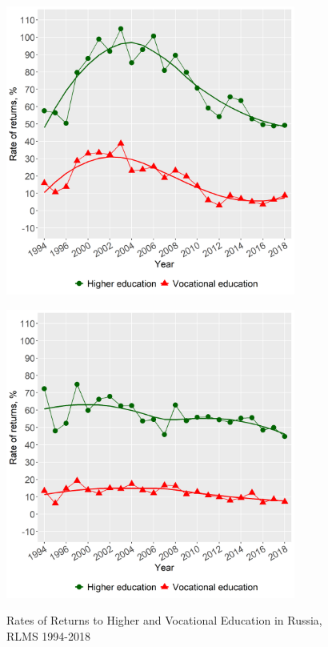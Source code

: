 \documentclass[12pt,a4paper]{article}
\begin{document}
\begin{figure}[H]
  \begin{minipage}[b]{.5\linewidth}
     \centering
     \hspace*{-0.7in}
     \includegraphics[width=270pt]{p2a.png}
     \label{fig:2a}
  \end{minipage}
  \hfill
  \begin{minipage}[b]{.5\linewidth}
     \centering
     \hspace*{0in}
     \includegraphics[width=270pt]{p2b.png}
     \label{fig:2b}
  \end{minipage}
  \caption{Rates of Returns to Higher and Vocational Education in Russia, RLMS 1994-2018}\label{fig:2}
\end{figure}
\end{document}
